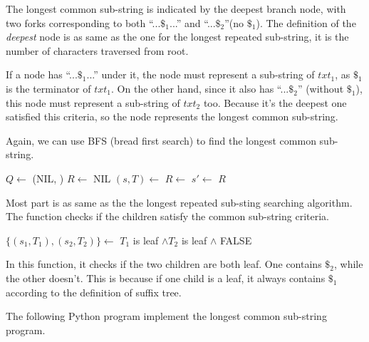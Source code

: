 \documentclass{article}
\begin{document}
The longest common sub-string is indicated by the deepest branch node, with
two forks corresponding to both ``...$\$_1$...'' and ``...$\$_2$''(no $\$_1$).
The definition of the {\em deepest} node is as same as the one for
the longest repeated sub-string, it is the number of characters traversed
from root.

If a node has ``...$\$_1$...'' under it, the node must represent
a sub-string of $txt_1$, as $\$_1$ is the terminator of $txt_1$.
On the other hand, since it also has ``...$\$_2$'' (without $\$_1$), this node
must represent a sub-string of $txt_2$ too. Because it's the deepest
one satisfied this criteria, so the node represents the longest common
sub-string.

Again, we can use BFS (bread first search) to find the longest common sub-string.

\begin{algorithmic}[1]
  \State $Q \gets$ (NIL, )
  \State $R \gets$ NIL
    \State $(s, T) \gets$ 
      \State $R \gets$ 
    \EndIf
        \State $s' \gets$ 
        \State {}
      \EndIf
    \EndFor
  \EndWhile
  \State \Return $R$
\EndFunction
\end{algorithmic}

Most part is as same as the the longest repeated sub-sting searching algorithm.
The function  checks if the children satisfy the common sub-string criteria.

\begin{algorithmic}[1]
    \State $\{(s_1, T_1), (s_2, T_2)\} \gets$ 
    \State \Return $T_1$ is leaf $\land T_2$ is leaf $\land$ 
  \EndIf
  \State \Return FALSE
\EndFunction
\end{algorithmic}

In this function, it checks if the two children
are both leaf. One contains $\$_2$, while the
other doesn't. This is because
if one child is a leaf, it always contains $\$_1$
according to the definition of suffix tree.

The following Python program implement the longest common sub-string program.
\end{document}
